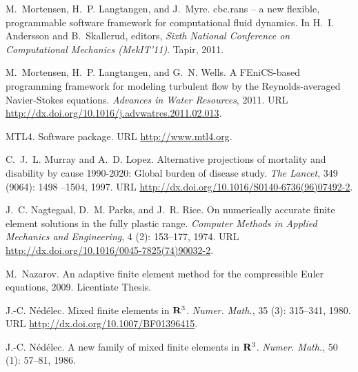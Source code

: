 \begin{thebibliography}{467}
M.~Mortensen, H.~P. Langtangen, and J.~Myre.
\newblock cbc.rans -- a new flexible, programmable software framework for
  computational fluid dynamics.
\newblock In H.~I. Andersson and B.~Skallerud, editors, \emph{Sixth National
  Conference on Computational Mechanics (MekIT'11)}. Tapir, 2011{}.

M.~Mortensen, H.~P. Langtangen, and G.~N. Wells.
\newblock A {FEniCS}-based programming framework for modeling turbulent flow by
  the {Reynolds}-averaged {Navier-Stokes} equations.
\newblock \emph{Advances in Water Resources}, 2011{}.
\newblock URL \url{http://dx.doi.org/10.1016/j.advwatres.2011.02.013}.

MTL4.
\newblock Software package.
\newblock URL \url{http://www.mtl4.org}.

C.~J.~L. Murray and A.~D. Lopez.
\newblock Alternative projections of mortality and disability by cause
  1990-2020: Global burden of disease study.
\newblock \emph{The Lancet}, 349 (9064): 1498 --1504, 1997.
\newblock URL \url{http://dx.doi.org/10.1016/S0140-6736(96)07492-2}.

J.~C. Nagtegaal, D.~M. Parks, and J.~R. Rice.
\newblock On numerically accurate finite element solutions in the fully plastic
  range.
\newblock \emph{Computer Methods in Applied Mechanics and Engineering},
  4 (2): 153--177, 1974.
\newblock URL \url{http://dx.doi.org/10.1016/0045-7825(74)90032-2}.

M.~Nazarov.
\newblock An adaptive finite element method for the compressible {E}uler
  equations, 2009.
\newblock Licentiate Thesis.

J.-C. N{\'e}d{\'e}lec.
\newblock Mixed finite elements in {${\bf R}^{3}$}.
\newblock \emph{Numer. Math.}, 35 (3): 315--341, 1980.
\newblock URL \url{http://dx.doi.org/10.1007/BF01396415}.

J.-C. N{\'e}d{\'e}lec.
\newblock A new family of mixed finite elements in {${\bf R}\sp 3$}.
\newblock \emph{Numer. Math.}, 50 (1): 57--81, 1986.


\end{thebibliography}
